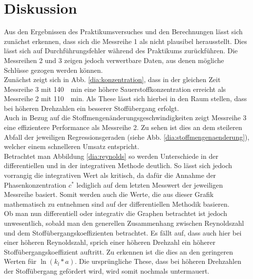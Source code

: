 \newpage
\section{Diskussion}
\label{sec:diskussion}
Aus den Ergebnissen des Praktikumsversuches und den Berechnungen lässt sich zunächst erkennen, dass sich die Messreihe 1 als nicht plausibel herausstellt. Dies lässt sich auf Durchführungsfehler während des Praktikums zurückführen. Die Messreihen 2 und 3 zeigen jedoch verwertbare Daten, aus denen mögliche Schlüsse gezogen werden können.\\

Zunächst zeigt sich in Abb. \ref{dia:konzentration}, dass in der gleichen Zeit Messreihe 3 mit \SI{140}{\per \minute} eine höhere Sauerstoffkonzentration erreicht als Messreihe 2 mit \SI{110}{\per \minute}. Als These lässt sich hierbei in den Raum stellen, dass bei höheren Drehzahlen ein besserer Stoffübergang erfolgt.\\

Auch in Bezug auf die Stoffmengenänderungsgeschwindigkeiten zeigt Messreihe 3 eine effizientere Performance als Messreihe 2. Zu sehen ist dies an dem steileren Abfall der jeweiligen Regressionsgeraden (siehe Abb. \ref{dia:stoffmengenaenderung}), welcher einem schnelleren Umsatz entspricht.\\

Betrachtet man Abbildung \ref{dia:reynolds} so werden Unterschiede in der differentiellen und in der integrativen Methode deutlich. So lässt sich jedoch vorrangig die integrativen Wert als kritisch, da dafür die Annahme der Phasenkonzentration $c^\ast$ lediglich auf dem letzten Messwert der jeweiligen Messreihe basiert. Somit werden auch die Werte, die aus dieser Grafik mathematisch zu entnehmen sind auf der differentiellen Methodik basieren. \\
Ob man nun differentiell oder integrativ die Graphen betrachtet ist jedoch unwesentlich, sobald man den generellen Zusammenhang zwischen Reynoldszahl und dem Stoffübergangskoeffizienten betrachtet. Es fällt auf, dass auch hier bei einer höheren Reynoldszahl, sprich einer höheren Drehzahl ein höherer Stoffübergangskoeffizient auftritt. Zu erkennen ist die dies an den geringeren Werten für $\ln\left(k_l*a\right)$.
Die ursprüngliche These, dass bei höheren Drehzahlen der Stoffübergang gefördert wird, wird somit nochmals untermauert.\\

